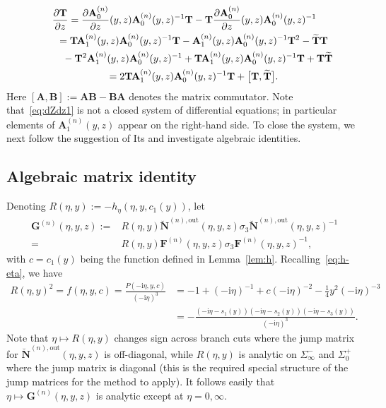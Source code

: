 \documentclass[pdftex]{sigma}
\numberwithin{equation}{section}
\begin{document}
\begin{gather}
\frac{\partial\mathbf{T}}{\partial z} = \frac{\partial\mathbf{A}_0^{(n)}}{\partial z}(y,z)\mathbf{A}_0^{(n)}(y,z)^{-1}\mathbf{T}-\mathbf{T}\frac{\partial\mathbf{A}_0^{(n)}}{\partial z}(y,z)\mathbf{A}_0^{(n)}(y,z)^{-1}\nonumber\\
\hphantom{\frac{\partial\mathbf{T}}{\partial z}}{} =\mathbf{T}\mathbf{A}_1^{(n)}(y,z)\mathbf{A}_0^{(n)}(y,z)^{-1}\mathbf{T}-\mathbf{A}_1^{(n)}(y,z)\mathbf{A}_0^{(n)}(y,z)^{-1}\mathbf{T}^2-\widetilde{\mathbf{T}}\mathbf{T} \nonumber\\
\hphantom{\frac{\partial\mathbf{T}}{\partial z}=}{} -\mathbf{T}^2\mathbf{A}_1^{(n)}(y,z)\mathbf{A}_0^{(n)}(y,z)^{-1}+\mathbf{T}\mathbf{A}_1^{(n)}(y,z)\mathbf{A}_0^{(n)}(y,z)^{-1}\mathbf{T}+\mathbf{T}\widetilde{\mathbf{T}}\nonumber\\
\hphantom{\frac{\partial\mathbf{T}}{\partial z}}{} =2\mathbf{T}\mathbf{A}_1^{(n)}(y,z)\mathbf{A}_0^{(n)}(y,z)^{-1}\mathbf{T}+\big[\mathbf{T},\widetilde{\mathbf{T}}\big].\label{eq:dZdz1}
\end{gather}
Here $[\mathbf{A},\mathbf{B}]:=\mathbf{AB}-\mathbf{BA}$ denotes the matrix commutator. Note that~\eqref{eq:dZdz1} is not a closed system of differential equations; in particular elements of $\mathbf{A}_1^{(n)}(y,z)$ appear on the right-hand side. To close the system, we next follow the suggestion of Its and investigate algebraic identities.

\subsection{Algebraic matrix identity}
Denoting $R(\eta,y):=-h_\eta(\eta,y,c_1(y))$, let
\begin{align}
\mathbf{G}^{(n)}(\eta,y,z):={} & R(\eta,y)\breve{\mathbf{N}}^{(n),\mathrm{out}}(\eta,y,z)\sigma_3\breve{\mathbf{N}}^{(n),\mathrm{out}}(\eta,y,z)^{-1} \nonumber\\
 = {} & R(\eta,y)\mathbf{F}^{(n)}(\eta,y,z)\sigma_3\mathbf{F}^{(n)}(\eta,y,z)^{-1},
\label{eq:G-def}
\end{align}
with $c=c_1(y)$ being the function defined in Lemma~\ref{lem:h}. Recalling~\eqref{eq:h-eta}, we have
\begin{align*}
R(\eta,y)^2 = f(\eta,y,c)=\frac{P(-\mathrm{i}\eta,y,c)}{(-\mathrm{i}\eta)^3} &= -1+(-\mathrm{i}\eta)^{-1}+c(-\mathrm{i}\eta)^{-2}-\tfrac{1}{4}y^2(-\mathrm{i}\eta)^{-3} \\ &= -\frac{(-\mathrm{i}\eta-s_1(y))(-\mathrm{i}\eta-s_2(y))(-\mathrm{i}\eta-s_3(y))}{(-\mathrm{i}\eta)^3}.
\end{align*}
Note that $\eta\mapsto R(\eta,y)$ changes sign across branch cuts where the jump matrix for $\breve{\mathbf{N}}^{(n),\mathrm{out}}(\eta,y,z)$ is off-diagonal, while $R(\eta,y)$ is analytic on $\Sigma_\infty^-$ and $\Sigma_0^+$ where the jump matrix is diagonal (this is the required special structure of the jump matrices for the method to apply). It follows easily that $\eta\mapsto\mathbf{G}^{(n)}(\eta,y,z)$ is analytic except at $\eta=0,\infty$.
\end{document}
